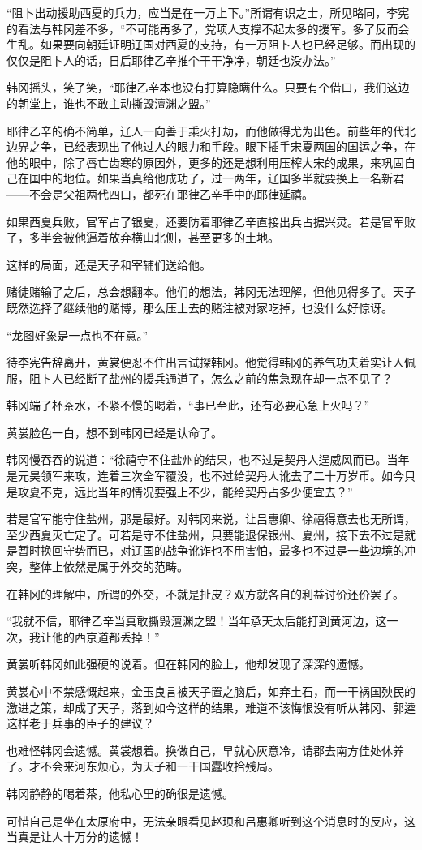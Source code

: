 “阻卜出动援助西夏的兵力，应当是在一万上下。”所谓有识之士，所见略同，李宪的看法与韩冈差不多，“不可能再多了，党项人支撑不起太多的援军。多了反而会生乱。如果要向朝廷证明辽国对西夏的支持，有一万阻卜人也已经足够。而出现的仅仅是阻卜人的话，日后耶律乙辛推个干干净净，朝廷也没办法。”

韩冈摇头，笑了笑，“耶律乙辛本也没有打算隐瞒什么。只要有个借口，我们这边的朝堂上，谁也不敢主动撕毁澶渊之盟。”

耶律乙辛的确不简单，辽人一向善于乘火打劫，而他做得尤为出色。前些年的代北边界之争，已经表现出了他过人的眼力和手段。眼下插手宋夏两国的国运之争，在他的眼中，除了唇亡齿寒的原因外，更多的还是想利用压榨大宋的成果，来巩固自己在国中的地位。如果当真给他成功了，过一两年，辽国多半就要换上一名新君——不会是父祖两代四口，都死在耶律乙辛手中的耶律延禧。

如果西夏兵败，官军占了银夏，还要防着耶律乙辛直接出兵占据兴灵。若是官军败了，多半会被他逼着放弃横山北侧，甚至更多的土地。

这样的局面，还是天子和宰辅们送给他。

赌徒赌输了之后，总会想翻本。他们的想法，韩冈无法理解，但他见得多了。天子既然选择了继续他的赌博，那么压上去的赌注被对家吃掉，也没什么好惊讶。

“龙图好象是一点也不在意。”

待李宪告辞离开，黄裳便忍不住出言试探韩冈。他觉得韩冈的养气功夫着实让人佩服，阻卜人已经断了盐州的援兵通道了，怎么之前的焦急现在却一点不见了？

韩冈端了杯茶水，不紧不慢的喝着，“事已至此，还有必要心急上火吗？”

黄裳脸色一白，想不到韩冈已经是认命了。

韩冈慢吞吞的说道：“徐禧守不住盐州的结果，也不过是契丹人逞威风而已。当年是元昊领军来攻，连着三次全军覆没，也不过给契丹人讹去了二十万岁币。如今只是攻夏不克，远比当年的情况要强上不少，能给契丹占多少便宜去？”

若是官军能守住盐州，那是最好。对韩冈来说，让吕惠卿、徐禧得意去也无所谓，至少西夏灭亡定了。可若是守不住盐州，只要能退保银州、夏州，接下去不过是就是暂时换回守势而已，对辽国的战争讹诈也不用害怕，最多也不过是一些边境的冲突，整体上依然是属于外交的范畴。

在韩冈的理解中，所谓的外交，不就是扯皮？双方就各自的利益讨价还价罢了。

“我就不信，耶律乙辛当真敢撕毁澶渊之盟！当年承天太后能打到黄河边，这一次，我让他的西京道都丢掉！”

黄裳听韩冈如此强硬的说着。但在韩冈的脸上，他却发现了深深的遗憾。

黄裳心中不禁感慨起来，金玉良言被天子置之脑后，如弃土石，而一干祸国殃民的激进之策，却成了天子，落到如今这样的结果，难道不该悔恨没有听从韩冈、郭逵这样老于兵事的臣子的建议？

也难怪韩冈会遗憾。黄裳想着。换做自己，早就心灰意冷，请郡去南方佳处休养了。才不会来河东烦心，为天子和一干国蠹收拾残局。

韩冈静静的喝着茶，他私心里的确很是遗憾。

可惜自己是坐在太原府中，无法亲眼看见赵顼和吕惠卿听到这个消息时的反应，这当真是让人十万分的遗憾！

